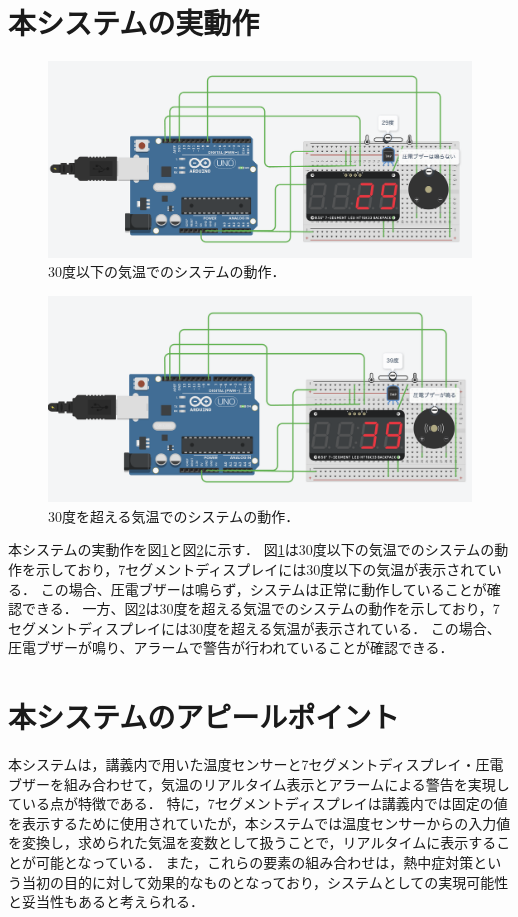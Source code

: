 \documentclass[uplatex,dvipdfmx]{jsarticle}
\begin{document}
\section{本システムの実動作}
\begin{figure}[H]
\centering
\includegraphics[width=1.0\linewidth]{./Figs/30low.png}
\caption{30度以下の気温でのシステムの動作．}
\label{fig:30low}
\end{figure}
\begin{figure}[H]
\centering
\includegraphics[width=1.0\linewidth]{./Figs/30high.png}
\caption{30度を超える気温でのシステムの動作．}
\label{fig:30high}
\end{figure}

\indent
本システムの実動作を図\ref{fig:30low}と図\ref{fig:30high}に示す．
図\ref{fig:30low}は30度以下の気温でのシステムの動作を示しており，7セグメントディスプレイには30度以下の気温が表示されている．
この場合、圧電ブザーは鳴らず，システムは正常に動作していることが確認できる．
一方、図\ref{fig:30high}は30度を超える気温でのシステムの動作を示しており，7セグメントディスプレイには30度を超える気温が表示されている．
この場合、圧電ブザーが鳴り、アラームで警告が行われていることが確認できる．

\section{本システムのアピールポイント}
\indent
本システムは，講義内で用いた温度センサーと7セグメントディスプレイ・圧電ブザーを組み合わせて，気温のリアルタイム表示とアラームによる警告を実現している点が特徴である．
特に，7セグメントディスプレイは講義内では固定の値を表示するために使用されていたが，本システムでは温度センサーからの入力値を変換し，求められた気温を変数として扱うことで，リアルタイムに表示することが可能となっている．
また，これらの要素の組み合わせは，熱中症対策という当初の目的に対して効果的なものとなっており，システムとしての実現可能性と妥当性もあると考えられる．
\end{document}
